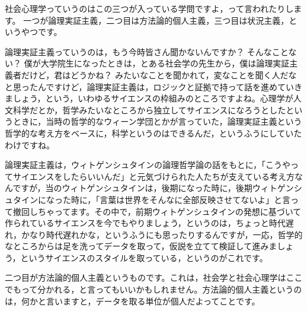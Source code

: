 \documentclass{ltjsbook}
\begin{document}
社会心理学っていうのはこの三つが入っている学問ですよ，って言われたりします。
一つが論理実証主義，二つ目は方法論的個人主義，三つ目は状況主義，というやつです。

論理実証主義っていうのは，もう今時皆さん聞かないんですか？ そんなことない？ 僕が大学院生になったときは，とある社会学の先生から，僕は論理実証主義者だけど，君はどうかね？ みたいなことを聞かれて，変なことを聞く人だなと思ったんですけど，論理実証主義は，ロジックと証拠で持って話を進めていきましょう，という，いわゆるサイエンスの枠組みのところですよね。心理学が人文科学だとか，哲学みたいなところから独立してサイエンスになろうとしたというときに，当時の哲学的なウィーン学団とかが言っていた，論理実証主義という哲学的な考え方をベースに，科学というのはできるんだ，というふうにしていたわけですね。

論理実証主義は，ウィトゲンシュタインの論理哲学論の話をもとに，「こうやってサイエンスをしたらいいんだ」と元気づけられた人たちが支えている考え方なんですが，当のウィトゲンシュタインは，後期になった時に，後期ウィトゲンシュタインになった時に，「言葉は世界をそんなに全部反映させてないよ」と言って撤回しちゃってます。その中で，前期ウィトゲンシュタインの発想に基づいて作られているサイエンスを今でもやりましょう，というのは，ちょっと時代遅れ，かなり時代遅れかな，というふうにも思ったりするんですが，一応，哲学的なところからは足を洗ってデータを取って，仮説を立てて検証して進みましょう，というサイエンスのスタイルを取っている，というのがこれです。

二つ目が方法論的個人主義というものです。これは，社会学と社会心理学はここでもって分かれる，と言ってもいいかもしれません。方法論的個人主義というのは，何かと言いますと，データを取る単位が個人だよってことです。
\end{document}
